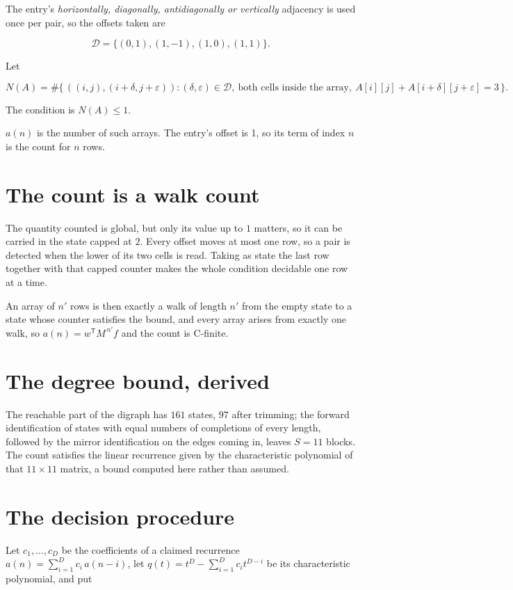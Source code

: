 \documentclass[11pt]{article}
\theoremstyle{definition}
\begin{document}
The entry's {\itshape horizontally, diagonally, antidiagonally or vertically} adjacency is used once per pair, so the offsets taken are

\[\mathcal{D} = \{(0,1), (1,-1), (1,0), (1,1)\}.\]

Let

\[N(A) = \#\bigl\{\,((i,j),(i{+}\delta,j{+}\varepsilon)) : (\delta,\varepsilon) \in \mathcal{D},\ \text{both cells inside the array},\ A[i][j] + A[i{+}\delta][j{+}\varepsilon] = 3\,\bigr\}.\]

The condition is $N(A) \le 1$.

$a(n)$ is the number of such arrays. The entry's offset is 1, so its term of index $n$ is the count for $n$ rows.

\section{The count is a walk count}

The quantity counted is global, but only its value up to $1$ matters, so it can be carried in the state capped at $2$. Every offset moves at most one row, so a pair is detected when the lower of its two cells is read. Taking as state the last row together with that capped counter makes the whole condition decidable one row at a time.

An array of $n'$ rows is then exactly a walk of length $n'$ from the empty state to a state whose counter satisfies the bound, and every array arises from exactly one walk, so $a(n) = w^{\mathsf T}M^{\,n'}f$ and the count is C-finite.

\section{The degree bound, derived}

The reachable part of the digraph has $161$ states, $97$ after trimming; the forward identification of states with equal numbers of completions of every length, followed by the mirror identification on the edges coming in, leaves $S = 11$ blocks. The count satisfies the linear recurrence given by the characteristic polynomial of that $11\times11$ matrix, a bound computed here rather than assumed.

\section{The decision procedure}

Let $c_1,\dots,c_D$ be the coefficients of a claimed recurrence $a(n) = \sum_{i=1}^{D} c_i\,a(n-i)$, let $q(t) = t^{D} - \sum_{i=1}^{D} c_i t^{D-i}$ be its characteristic polynomial, and put
\end{document}
